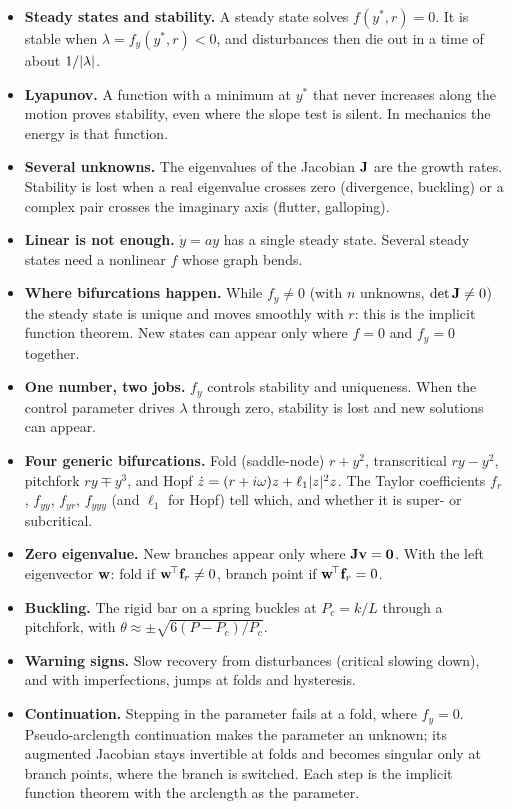 \begin{gbox*}
\begin{itemize}
  \item \textbf{Steady states and stability.} A steady state solves $f(y^*,r) = 0$.
        It is stable when $\lambda = f_y(y^*,r) < 0$, and disturbances then die out
        in a time of about $1/\lvert \lambda\rvert$.
  \item \textbf{Lyapunov.} A function with a minimum at $y^*$ that never increases
        along the motion proves stability, even where the slope test is silent.
        In mechanics the energy is that function.
  \item \textbf{Several unknowns.} The eigenvalues of the Jacobian $\mathbf{J}$ are the
        growth rates. Stability is lost when a real eigenvalue crosses zero
        (divergence, buckling) or a complex pair crosses the imaginary axis
        (flutter, galloping).
  \item \textbf{Linear is not enough.} $\dot y = ay$ has a single steady state.
        Several steady states need a nonlinear $f$ whose graph bends.
  \item \textbf{Where bifurcations happen.} While $f_y \neq 0$ (with $n$ unknowns,
        $\det\mathbf{J} \neq 0$) the steady state is unique and moves smoothly with $r$:
        this is the implicit function theorem. New states can appear only where
        $f = 0$ and $f_y = 0$ together.
  \item \textbf{One number, two jobs.} $f_y$ controls stability and uniqueness.
        When the control parameter drives $\lambda$ through zero, stability is lost
        and new solutions can appear.
  \item \textbf{Four generic bifurcations.} Fold (saddle-node) $r + y^2$,
        transcritical $ry - y^2$, pitchfork $ry \mp y^3$, and Hopf
        $\dot z = (r + i\omega)z + \ell_1\lvert z\rvert^2z$. The Taylor coefficients $f_r$,
        $f_{yy}$, $f_{yr}$, $f_{yyy}$ (and $\ell_1$ for Hopf) tell which, and whether
        it is super- or subcritical.
  \item \textbf{Zero eigenvalue.} New branches appear only where
        $\mathbf{J}\mathbf{v} = \mathbf{0}$. With the left eigenvector $\mathbf{w}$:
        fold if $\mathbf{w}^{\!\top}\mathbf{f}_r \neq 0$, branch point if $\mathbf{w}^{\!\top}\mathbf{f}_r = 0$.
  \item \textbf{Buckling.} The rigid bar on a spring buckles at $P_c = k/L$ through
        a pitchfork, with $\theta \approx \pm\sqrt{6(P - P_c)/P_c}$.
  \item \textbf{Warning signs.} Slow recovery from disturbances (critical slowing
        down), and with imperfections, jumps at folds and hysteresis.
  \item \textbf{Continuation.} Stepping in the parameter fails at a fold, where
        $f_y = 0$. Pseudo-arclength continuation makes the parameter an unknown; its
        augmented Jacobian stays invertible at folds and becomes singular only at
        branch points, where the branch is switched. Each step is the implicit
        function theorem with the arclength as the parameter.
\end{itemize}
\end{gbox*}

